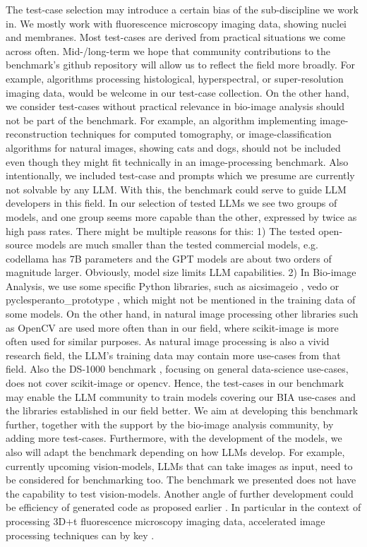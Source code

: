 \documentclass{ecai}
\begin{document}
The test-case selection may introduce a certain bias of the sub-discipline we work in. We mostly work with fluorescence microscopy imaging data, showing nuclei and membranes. Most test-cases are derived from practical situations we come across often. Mid-/long-term we hope that community contributions to the benchmark’s github repository will allow us to reflect the field more broadly. For example, algorithms processing histological, hyperspectral, or super-resolution imaging data, would be welcome in our test-case collection. On the other hand, we consider test-cases without practical relevance in bio-image analysis should not be part of the benchmark. For example, an algorithm implementing image-reconstruction techniques for computed tomography, or image-classification algorithms for natural images, showing cats and dogs, should not be included even though they might fit technically in an image-processing benchmark. Also intentionally, we included test-case and prompts which we presume are currently not solvable by any LLM. With this, the benchmark could serve to guide LLM developers in this field.
In our selection of tested LLMs we see two groups of models, and one group seems more capable than the other, expressed by twice as high pass rates. There might be multiple reasons for this: 1) The tested open-source models are much smaller than the tested commercial models, e.g. codellama has 7B parameters and the GPT models are about two orders of magnitude larger. Obviously, model size limits LLM capabilities. 2) In Bio-image Analysis, we use some specific Python libraries, such as aicsimageio \citep{aicsimageio}, vedo \citep{musy2024} or pyclesperanto\_prototype \citep{robert_haase_2023_10432619}, which might not be mentioned in the training data of some models. On the other hand, in natural image processing other libraries such as OpenCV \citep{itseez2015opencv} are used more often than in our field, where scikit-image \citep{scikit-image} is more often used for similar purposes. As natural image processing is also a vivid research field, the LLM’s training data may contain more use-cases from that field. Also the DS-1000 benchmark \citep{lai2022ds1000}, focusing on general data-science use-cases, does not cover scikit-image or opencv. Hence, the test-cases in our benchmark may enable the LLM community to train models covering our BIA use-cases and the libraries established in our field better.
We aim at developing this benchmark further, together with the support by the bio-image analysis community, by adding more test-cases. Furthermore, with the development of the models, we also will adapt the benchmark depending on how LLMs develop. For example, currently upcoming vision-models, LLMs that can take images as input, need to be considered for benchmarking too. The benchmark we presented does not have the capability to test vision-models. Another angle of further development could be efficiency of generated code as proposed earlier \citep{du2024mercury}. In particular in the context of processing 3D+t fluorescence microscopy imaging data, accelerated image processing techniques can by key \citep{Haase2020}. 
\end{document}
